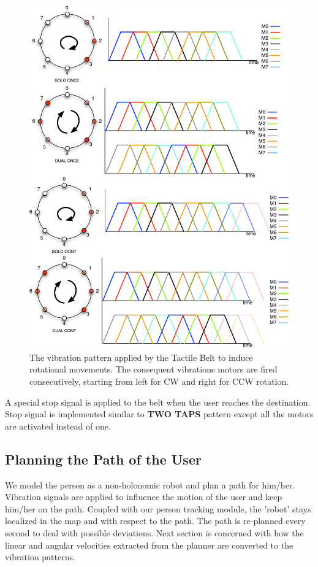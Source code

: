 \begin{figure}[ht!]
\centering
\includegraphics[width=1.0\textwidth]{pics/vibration_pattern_solo_cont}
\caption{The vibration pattern applied by the Tactile Belt to induce rotational movements. The consequent vibrations motors are fired consecutively, starting from left for CW and right for CCW rotation.}
\label{fig:vibration_pattern_solo_cont}
\end{figure}

A special stop signal is applied to the belt when the user reaches the destination. Stop signal is implemented similar to \textbf{TWO TAPS} pattern except all the motors are activated instead of one.


\subsection{Planning the Path of the User}

We model the person as a non-holonomic robot and plan a path for him/her. Vibration signals are applied to influence the motion of the user and keep him/her on the path. Coupled with our person tracking module, the 'robot' stays localized in the map and with respect to the path. The path is re-planned every second to deal with possible deviations. Next section is concerned with how the linear and angular velocities extracted from the planner are converted to the vibration patterns.

